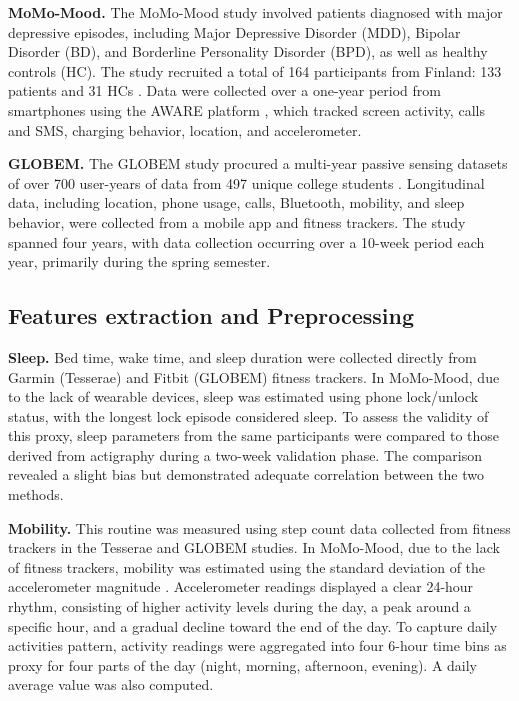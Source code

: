 \documentclass[pdflatex,sn-vancouver,Numbered]{bst/sn-jnl}%
\theoremstyle{thmstyleone}%
\theoremstyle{thmstyletwo}%
\theoremstyle{thmstylethree}%
\begin{document}
\textbf{MoMo-Mood.} The MoMo-Mood study involved patients diagnosed with major depressive episodes, including Major Depressive Disorder (MDD), Bipolar Disorder (BD), and Borderline Personality Disorder (BPD), as well as healthy controls (HC). The study recruited a total of 164 participants from Finland: 133 patients and 31 HCs \cite{aledavood2025multimodal}. Data were collected over a one-year period from smartphones using the AWARE platform \cite{ferreiraAWAREMobileContext2015}, which tracked screen activity, calls and SMS, charging behavior, location, and accelerometer.

\textbf{GLOBEM.} The GLOBEM study procured a multi-year passive sensing datasets of over 700 user-years of data from 497 unique college students \cite{xu2022globem}. Longitudinal data, including location, phone usage, calls, Bluetooth, mobility, and sleep behavior, were collected from a mobile app and fitness trackers. The study spanned four years, with data collection occurring over a 10-week period each year, primarily during the spring semester. 

\subsection*{Features extraction and Preprocessing} \label{sec:methods:features_extraction}  

\textbf{Sleep.} Bed time, wake time, and sleep duration were collected directly from Garmin (Tesserae) and Fitbit (GLOBEM) fitness trackers. In MoMo-Mood, due to the lack of wearable devices, sleep was estimated using phone lock/unlock status, with the longest lock episode considered sleep. To assess the validity of this proxy, sleep parameters from the same participants were compared to those derived from actigraphy during a two-week validation phase. The comparison revealed a slight bias but demonstrated adequate correlation between the two methods.

\textbf{Mobility.} This routine was measured using step count data collected from fitness trackers in the Tesserae and GLOBEM studies. In MoMo-Mood, due to the lack of fitness trackers, mobility was estimated using the standard deviation of the accelerometer magnitude \cite{ravi2005activity}. Accelerometer readings displayed a clear 24-hour rhythm, consisting of higher activity levels during the day, a peak around a specific hour, and a gradual decline toward the end of the day. To capture daily activities pattern, activity readings were aggregated into four 6-hour time bins as proxy for four parts of the day (night, morning, afternoon, evening). A daily average value was also computed.
\end{document}

